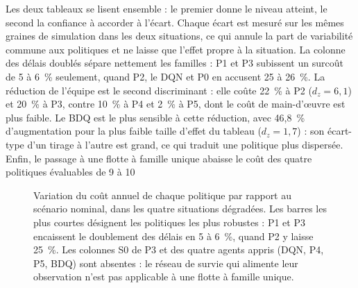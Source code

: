 Les deux tableaux se lisent ensemble : le premier donne le niveau atteint, le second la confiance à accorder à l'écart. Chaque écart est mesuré sur les mêmes graines de simulation dans les deux situations, ce qui annule la part de variabilité commune aux politiques et ne laisse que l'effet propre à la situation. La colonne des délais doublés sépare nettement les familles : P1 et P3 subissent un surcoût de 5 à 6~\% seulement, quand P2, le DQN et P0 en accusent 25 à 26~\%. La réduction de l'équipe est le second discriminant : elle coûte 22~\% à P2 ($d_z = 6{,}1$) et 20~\% à P3, contre 10~\% à P4 et 2~\% à P5, dont le coût de main-d'œuvre est plus faible. Le BDQ est le plus sensible à cette réduction, avec 46,8~\% d'augmentation pour la plus faible taille d'effet du tableau ($d_z = 1{,}7$) : son écart-type d'un tirage à l'autre est grand, ce qui traduit une politique plus dispersée. Enfin, le passage à une flotte à famille unique abaisse le coût des quatre politiques évaluables de 9 à 10~%

\begin{figure}[H]
\centering
{}
\caption{Variation du coût annuel de chaque politique par rapport au scénario nominal, dans les quatre situations dégradées. Les barres les plus courtes désignent les politiques les plus robustes : P1 et P3 encaissent le doublement des délais en 5 à 6~\%, quand P2 y laisse 25~\%. Les colonnes S0 de P3 et des quatre agents appris (DQN, P4, P5, BDQ) sont absentes : le réseau de survie qui alimente leur observation n'est pas applicable à une flotte à famille unique.}
\label{fig:robustesse}
\end{figure}

